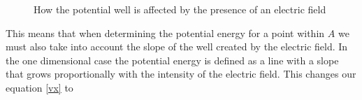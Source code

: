 \documentclass[authoryearcitations]{UoYCSproject}
\begin{document}
\begin{figure}[h]
  \centering
  \hspace{0.5 in}
    \caption{How the potential well is affected by the presence of an electric field}
  \label{fieldWell}
\end{figure}

This means that when determining the potential energy for a point within $A$ we must also take into account the 
slope of the well created by the electric field. In the one 
dimensional case the potential energy is defined as a line with a slope that grows proportionally 
with the intensity of the electric field. This changes our equation \ref{vx} to
\end{document}
